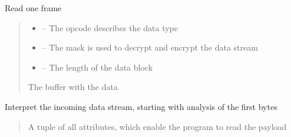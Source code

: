 \documentclass[letterpaper,10pt,english]{sphinxmanual}
\begin{document}
\begin{savenotes}
\begin{fulllineitems}
\begin{savenotes}
\begin{fulllineitems}
\end{fulllineitems}\end{savenotes}


\begin{savenotes}\begin{fulllineitems}
\label{\detokenize{eezz:eezz.websocket.TWebSocketClient.read_frame}}
\pysigstartsignatures
{}
\pysigstopsignatures
\sphinxAtStartPar
Read one frame
\begin{quote}\begin{description}
\begin{itemize}
\item {} 
\sphinxAtStartPar
{} – The opcode describes the data type

\item {} 
\sphinxAtStartPar
{} – The mask is used to decrypt and encrypt the data stream

\item {} 
\sphinxAtStartPar
{} – The length of the data block

\end{itemize}

\sphinxAtStartPar
The buffer with the data

\end{description}\end{quote}

\end{fulllineitems}\end{savenotes}


\begin{savenotes}\begin{fulllineitems}
\label{\detokenize{eezz:eezz.websocket.TWebSocketClient.read_frame_header}}
\pysigstartsignatures
{}
\pysigstopsignatures
\sphinxAtStartPar
Interpret the incoming data stream, starting with analysis of the first bytes
\begin{quote}\begin{description}
\sphinxAtStartPar
A tuple of all attributes, which enable the program to read the pay\sphinxhyphen{}load


\end{description}
\end{quote}
\end{fulllineitems}
\end{savenotes}
\end{fulllineitems}
\end{savenotes}
\end{document}

